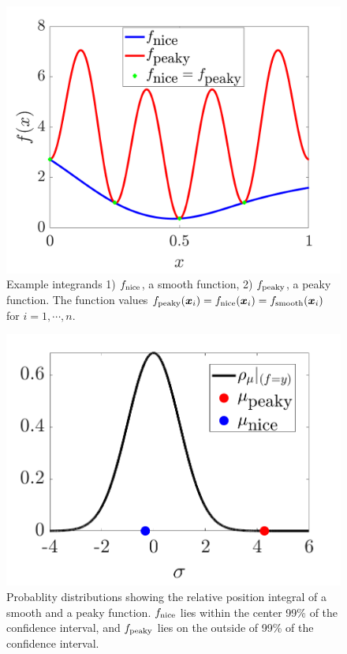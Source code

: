 \documentclass{iitthesis}          %
\newcommand{\bm}[1]{\boldsymbol{#1}}
\newcommand{\vx}{\bm{x}}
\newcommand{\NICE}{\textup{nice}}
\newcommand{\PEAKY}{\textup{peaky}}
\newcommand{\TRUE}{\textup{smooth}}
\newcommand{\JRNote}[1]{}
\begin{document}
\begin{figure}[ht]
	\centering
	\includegraphics[width=0.8\linewidth]{cone_bayes_f_real}
	\caption{Example integrands 1) $f_{\NICE}$, a smooth function, 2) $f_{\PEAKY}$, a peaky function. The function values $f_{\PEAKY}(\vx_i) = f_{\NICE}(\vx_i) = f_{\TRUE}(\vx_i) $ for $i=1, \cdots, n$.}
	\label{fig:cone_bayes_functions}
\end{figure}
\begin{figure}[ht]
	\centering
	\includegraphics[width=0.8\linewidth]{cone_bayes_mu_pdf}
	\caption{Probablity distributions showing the relative position integral of a smooth and a peaky function. $f_{\NICE}$ lies within the center 99\% of the confidence interval, and $f_{\PEAKY}$ lies on the outside of 99\% of  the confidence interval.}
	\label{fig:cone_bayes_posterior}
\end{figure}
\end{document}
